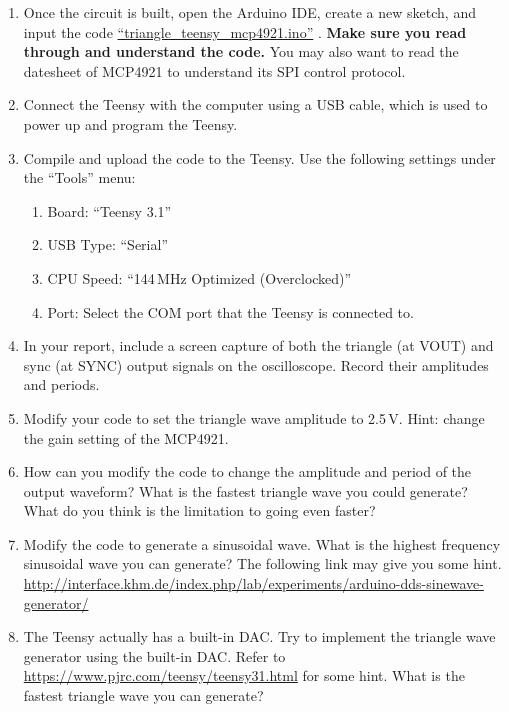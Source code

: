 \documentclass[letterpaper, 11pt]{article}
\begin{document}
\begin{enumerate}
\item Once the circuit is built, open the Arduino IDE, create a new sketch, and input the code \href{https://github.com/ucdart/UCD-EEC134/blob/master/Lab1/triangle.ino}{``triangle\_teensy\_mcp4921.ino''} . \textbf{Make sure you read through and understand the code.} You may also want to read the datesheet of MCP4921 to understand its SPI control protocol. 

\item Connect the Teensy with the computer using a USB cable, which is used to power up and program the Teensy.

\item Compile and upload the code to the Teensy. Use the following settings under the ``Tools'' menu: 
	\begin{enumerate}
		\item Board: ``Teensy 3.1''
		\item USB Type: ``Serial''
		\item CPU Speed: ``144\,MHz Optimized (Overclocked)''
		\item Port: Select the COM port that the Teensy is connected to. 
	\end{enumerate}

\item In your report, include a screen capture of both the triangle (at VOUT) and sync (at SYNC) output signals on the oscilloscope. Record their amplitudes and periods.

\item Modify your code to set the triangle wave amplitude to 2.5\,V. Hint: change the gain setting of the MCP4921. 

\item How can you modify the code to change the amplitude and period of the output waveform? What is the fastest triangle wave you could generate? What do you think is the limitation to going even faster?

\item Modify the code to generate a sinusoidal wave. What is the highest frequency sinusoidal wave you can generate? The following link may give you some hint. 
\url{http://interface.khm.de/index.php/lab/experiments/arduino-dds-sinewave-generator/} 


\item The Teensy actually has a built-in DAC. Try to implement the triangle wave generator using the built-in DAC. Refer to \url{https://www.pjrc.com/teensy/teensy31.html} for some hint. What is the fastest triangle wave you can generate?


\end{enumerate}
\end{document}
